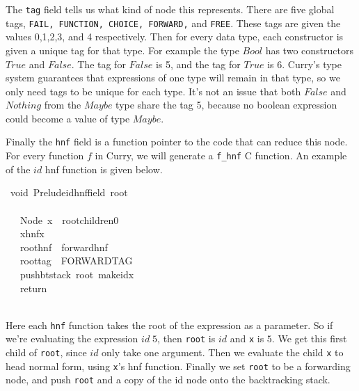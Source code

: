 \documentclass{book}
\theoremstyle{definition}
\newcommand{\Conid}[1]{\mathit{#1}}
\newcommand{\Varid}[1]{\mathit{#1}}
\begin{document}
The \texttt{tag} field tells us what kind of node this represents.
There are five global tags, \texttt{FAIL, FUNCTION, CHOICE, FORWARD,} and \texttt{FREE}.
These tags are given the values 0,1,2,3, and 4 respectively.
Then for every data type, each constructor is given a unique tag for that type.
For example the type \ensuremath{\Conid{Bool}} has two constructors \ensuremath{\Conid{True}} and \ensuremath{\Conid{False}}.
The tag for \ensuremath{\Conid{False}} is 5, and the tag for \ensuremath{\Conid{True}} is 6.
Curry's type system guarantees that expressions of one type will remain in that type,
so we only need tags to be unique for each type.
It's not an issue that both \ensuremath{\Conid{False}} and \ensuremath{\Conid{Nothing}} from the \ensuremath{\Conid{Maybe}} type share the tag 5,
because no boolean expression could become a value of type \ensuremath{\Conid{Maybe}}.

Finally the \texttt{hnf} field is a function pointer to the code that can reduce this node.
For every function \ensuremath{\Varid{f}} in Curry, we will generate a \texttt{f\_hnf} C function.
An example of the \ensuremath{\Varid{id}} hnf function is given below.

\begin{tabbing}\ttfamily
~void~Preludeidhnffield~root\\
\ttfamily ~\\
\ttfamily ~~~Node~x~~rootchildren0\\
\ttfamily ~~~xhnfx\\
\ttfamily ~~~roothnf~~forwardhnf\\
\ttfamily ~~~roottag~~FORWARDTAG\\
\ttfamily ~~~pushbtstack~root~makeidx\\
\ttfamily ~~~return\\
\ttfamily ~
\end{tabbing}

Here each \texttt{hnf} function takes the root of the expression as a parameter.
So if we're evaluating the expression \ensuremath{\Varid{id}\;\mathrm{5}}, then \texttt{root} is \ensuremath{\Varid{id}}
and \texttt{x} is \ensuremath{\mathrm{5}}.
We get this first child of \texttt{root}, since \ensuremath{\Varid{id}} only take one argument.
Then we evaluate the child \texttt{x} to head normal form, using \texttt{x}'s hnf function.
Finally we set \texttt{root} to be a forwarding node,
and push \texttt{root} and a copy of the id node onto the backtracking stack.
\end{document}
